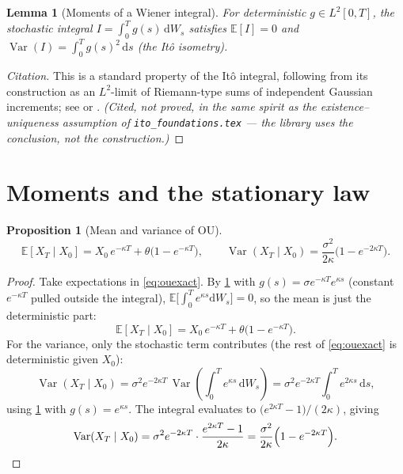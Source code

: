 \documentclass[11pt]{article}
\newcommand{\E}{\mathbb{E}}
\newcommand{\Var}{\operatorname{Var}}
\newcommand{\dd}{\mathrm{d}}
\theoremstyle{plain}
\newtheorem{lemma}{Lemma}
\newtheorem{proposition}{Proposition}
\theoremstyle{definition}
\theoremstyle{remark}
\begin{document}
\begin{lemma}[Moments of a Wiener integral]\label{lem:ito-isometry}
For deterministic $g\in L^2[0,T]$, the stochastic integral
$I=\int_0^T g(s)\,\dd W_s$ satisfies $\E[I]=0$ and
$\Var(I)=\int_0^T g(s)^2\,\dd s$ (the It\^o isometry).
\end{lemma}

\begin{proof}[Citation]
This is a standard property of the It\^o integral, following from its
construction as an $L^2$-limit of Riemann-type sums of independent
Gaussian increments; see  or
. \emph{(Cited, not proved, in the same spirit
as the existence--uniqueness assumption of \texttt{ito\_foundations.tex}
--- the library uses the conclusion, not the construction.)}
\end{proof}

\section{Moments and the stationary law}

\begin{proposition}[Mean and variance of OU]\label{prop:ou-moments}
\[
   \E[X_T\mid X_0] = X_0\,e^{-\kappa T} + \theta\big(1-e^{-\kappa T}\big),
   \qquad
   \Var(X_T\mid X_0) = \frac{\sigma^2}{2\kappa}\Big(1-e^{-2\kappa T}\Big).
\]
\end{proposition}

\begin{proof}
Take expectations in \eqref{eq:ouexact}. By \cref{lem:ito-isometry}
with $g(s)=\sigma e^{-\kappa T}e^{\kappa s}$ (constant $e^{-\kappa T}$
pulled outside the integral), $\E\big[\int_0^T e^{\kappa
s}\dd W_s\big]=0$, so the mean is just the deterministic part:
\[
   \E[X_T\mid X_0] = X_0\,e^{-\kappa T} + \theta\big(1-e^{-\kappa T}\big).
\]
For the variance, only the stochastic term contributes (the rest of
\eqref{eq:ouexact} is deterministic given $X_0$):
\[
   \Var(X_T\mid X_0)
     = \sigma^2 e^{-2\kappa T}\,\Var\!\left(\int_0^T e^{\kappa s}\,\dd W_s\right)
     = \sigma^2 e^{-2\kappa T}\int_0^T e^{2\kappa s}\,\dd s ,
\]
using \cref{lem:ito-isometry} with $g(s)=e^{\kappa s}$. The integral
evaluates to $\big(e^{2\kappa T}-1\big)/(2\kappa)$, giving
\[
   \Var(X_T\mid X_0)
     = \sigma^2 e^{-2\kappa T}\cdot\frac{e^{2\kappa T}-1}{2\kappa}
     = \frac{\sigma^2}{2\kappa}\Big(1-e^{-2\kappa T}\Big). \qedhere
\]
\end{proof}
\end{document}
